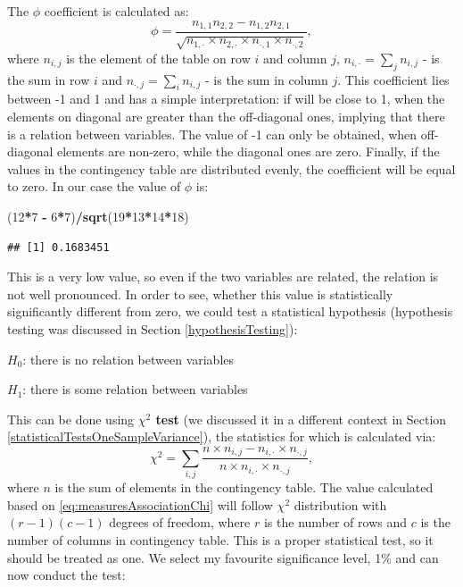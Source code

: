 \documentclass[
]{book}
\newenvironment{Shaded}{\begin{snugshade}}{\end{snugshade}}
\newcommand{\DecValTok}[1]{\textcolor[rgb]{0.00,0.00,0.81}{#1}}
\newcommand{\KeywordTok}[1]{\textcolor[rgb]{0.13,0.29,0.53}{\textbf{#1}}}
\newcommand{\NormalTok}[1]{#1}
\newcommand{\OperatorTok}[1]{\textcolor[rgb]{0.81,0.36,0.00}{\textbf{#1}}}
\newcommand{\StringTok}[1]{\textcolor[rgb]{0.31,0.60,0.02}{#1}}
\theoremstyle{definition}
\theoremstyle{definition}
\theoremstyle{definition}
\theoremstyle{definition}
\theoremstyle{remark}
\begin{document}
The \(\phi\) coefficient is calculated as:
\begin{equation}
    \phi = \frac{n_{1,1} n_{2,2} - n_{1,2} n_{2,1}}{\sqrt{n_{1,\cdot}\times n_{2,\cdot}\times n_{\cdot,1}\times n_{\cdot,2}}} ,
    \label{eq:measuresAssociationPhi}
\end{equation}
where \(n_{i,j}\) is the element of the table on row \(i\) and column \(j\), \(n_{i,\cdot}=\sum_{j}n_{i,j}\) - is the sum in row \(i\) and \(n_{\cdot,j}=\sum_{i} n_{i,j}\) - is the sum in column \(j\). This coefficient lies between -1 and 1 and has a simple interpretation: if will be close to 1, when the elements on diagonal are greater than the off-diagonal ones, implying that there is a relation between variables. The value of -1 can only be obtained, when off-diagonal elements are non-zero, while the diagonal ones are zero. Finally, if the values in the contingency table are distributed evenly, the coefficient will be equal to zero. In our case the value of \(\phi\) is:

\begin{Shaded}
\begin{Highlighting}[]
\NormalTok{(}\DecValTok{12}\OperatorTok{*}\DecValTok{7} \OperatorTok{{-}}\StringTok{ }\DecValTok{6}\OperatorTok{*}\DecValTok{7}\NormalTok{)}\OperatorTok{/}\KeywordTok{sqrt}\NormalTok{(}\DecValTok{19}\OperatorTok{*}\DecValTok{13}\OperatorTok{*}\DecValTok{14}\OperatorTok{*}\DecValTok{18}\NormalTok{)}
\end{Highlighting}
\end{Shaded}

\begin{verbatim}
## [1] 0.1683451
\end{verbatim}

This is a very low value, so even if the two variables are related, the relation is not well pronounced. In order to see, whether this value is statistically significantly different from zero, we could test a statistical hypothesis (hypothesis testing was discussed in Section \ref{hypothesisTesting}):

\(H_0\): there is no relation between variables

\(H_1\): there is some relation between variables

This can be done using \textbf{\(\chi^2\) test} (we discussed it in a different context in Section \ref{statisticalTestsOneSampleVariance}), the statistics for which is calculated via:
\begin{equation}
    \chi^2 = \sum_{i,j} \frac{n \times n_{i,j} - n_{i,\cdot} \times n_{\cdot,j}}{n \times n_{i,\cdot} \times n_{\cdot,j}} ,
    \label{eq:measuresAssociationChi}
\end{equation}
where \(n\) is the sum of elements in the contingency table. The value calculated based on \eqref{eq:measuresAssociationChi} will follow \(\chi^2\) distribution with \((r-1)(c-1)\) degrees of freedom, where \(r\) is the number of rows and \(c\) is the number of columns in contingency table. This is a proper statistical test, so it should be treated as one. We select my favourite significance level, 1\% and can now conduct the test:
\end{document}

